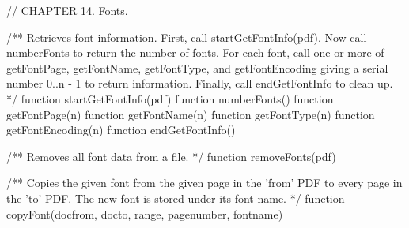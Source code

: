 // CHAPTER 14. Fonts.

/** Retrieves font information. First, call startGetFontInfo(pdf). Now call
numberFonts to return the number of fonts. For each font, call one or more of
getFontPage, getFontName, getFontType, and getFontEncoding giving a serial
number 0..n - 1 to return information. Finally, call endGetFontInfo to clean
up. */
function startGetFontInfo(pdf)
function numberFonts()
function getFontPage(n)
function getFontName(n)
function getFontType(n)
function getFontEncoding(n)
function endGetFontInfo()

/** Removes all font data from a file. */
function removeFonts(pdf)

/** Copies the given font from the given page in the 'from' PDF to every page
in the 'to' PDF. The new font is stored under its font name. */
function copyFont(docfrom, docto, range, pagenumber, fontname)
